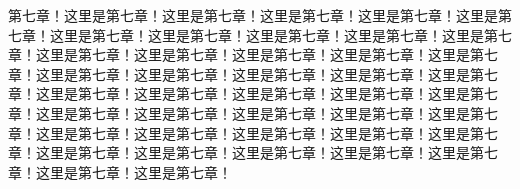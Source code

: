 第七章！这里是第七章！这里是第七章！这里是第七章！这里是第七章！这里是第七章！这里是第七章！这里是第七章！这里是第七章！这里是第七章！这里是第七章！这里是第七章！这里是第七章！这里是第七章！这里是第七章！这里是第七章！这里是第七章！这里是第七章！这里是第七章！这里是第七章！这里是第七章！这里是第七章！这里是第七章！这里是第七章！这里是第七章！这里是第七章！这里是第七章！这里是第七章！这里是第七章！这里是第七章！这里是第七章！这里是第七章！这里是第七章！这里是第七章！这里是第七章！这里是第七章！这里是第七章！这里是第七章！这里是第七章！这里是第七章！这里是第七章！这里是第七章！这里是第七章！
 